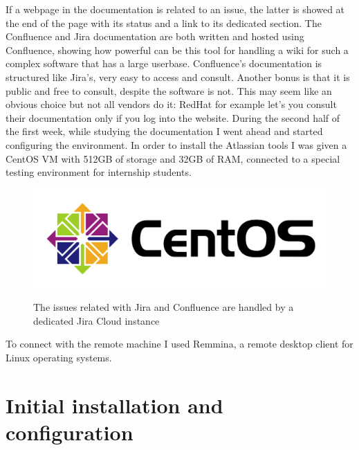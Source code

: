 	If a webpage in the documentation is related to an issue, the latter is showed at the end of the page with its status and a link to its dedicated section. 
	The Confluence and Jira documentation are both written and hosted using Confluence, showing how powerful can be this tool for handling a wiki for such a complex software that has a large userbase.
	Confluence's documentation is structured like Jira's, very easy to access and consult.	
	Another bonus is that it is public and free to consult, despite the software is not.
	This may seem like an obvious choice but not all vendors do it: RedHat for example let's you consult their documentation only if you log into the website.
	During the second half of the first week, while studying the documentation I went ahead and started configuring the environment.
	In order to install the Atlassian tools I was given a CentOS VM with 512GB of storage and 32GB of RAM, connected to a special testing environment for internship students.
	\begin{figure}[H]
		\centering
		\includegraphics[width=1\textwidth]{resources/centos_logo}\\
		\caption{The issues related with Jira and Confluence are handled by a dedicated Jira Cloud instance}
	\end{figure}
	To connect with the remote machine I used Remmina, a remote desktop client for Linux operating systems.
	
\section{Initial installation and configuration}
	
	
